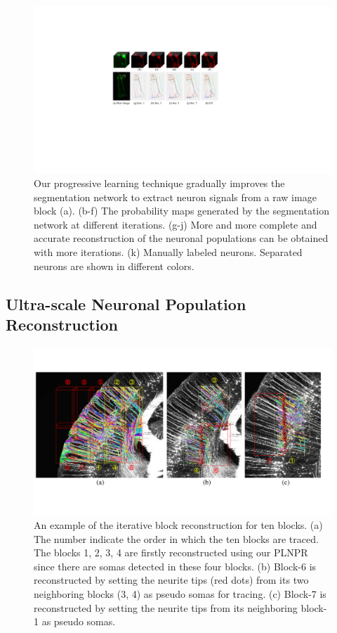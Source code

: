 \begin{figure}[t]
	\centering
	\includegraphics[width=1\columnwidth]{./Illustrations/ngps.pdf}
	\caption{Our progressive learning technique gradually improves the segmentation network to extract neuron signals from a raw image block (a). 
	(b-f) The probability maps generated by the segmentation network at different iterations.
	(g-j) More and more complete and accurate reconstruction of the neuronal populations can be obtained with more iterations. (k) Manually labeled neurons. Separated neurons are shown in different colors.}
	\label{fig:ngps}
\end{figure}
%

\subsection{Ultra-scale Neuronal Population Reconstruction}
\label{sec:UltraNPR}

\begin{figure}[t]
	\centering
	\includegraphics[width=1\columnwidth]{./Illustrations/ultranpr_block_search.pdf}
	\caption{An example of the iterative block reconstruction for ten blocks. (a) The number indicate the order in which the ten blocks are traced. The blocks 1, 2, 3, 4 are firstly reconstructed using our PLNPR since there are somas detected in these four blocks. (b) Block-6 is reconstructed by setting the neurite tips (red dots) from its two neighboring blocks (3, 4) as pseudo somas for tracing. (c) Block-7 is reconstructed by setting the neurite tips from its neighboring block-1 as pseudo somas.}
	\label{fig:blocksearch}
\end{figure}


